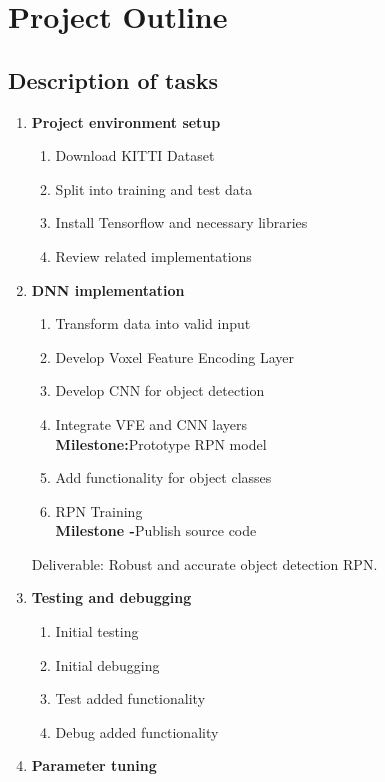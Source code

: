 \let\textcircled=\pgftextcircled
\chapter{Project Outline}
\label{chap:proj_outline}

\section{Description of tasks}

\begin{enumerate}
    \item \textbf{Project environment setup} 
    	\begin{enumerate}
    		\item Download KITTI Dataset
    		\item Split into training and test data
    		\item Install Tensorflow and necessary libraries 
    		\item Review related implementations
    	\end{enumerate}
    \item \textbf{DNN implementation}
   		\begin{enumerate}
   			\item Transform data into valid input
   			\item Develop Voxel Feature Encoding Layer
   			\item Develop CNN for object detection
   			\item Integrate VFE and CNN layers \\ 
   			\textbf{Milestone:}Prototype RPN model 
   			\item Add functionality for object classes 
   			\item RPN Training \\ 
   			\textbf{Milestone -}Publish source code 
   		\end{enumerate}
   	Deliverable: Robust and accurate object detection RPN.
    \item \textbf{Testing and debugging} 
    	\begin{enumerate}
    		\item Initial testing
    		\item Initial debugging
    		\item Test added functionality 
    		\item Debug added functionality 
    	\end{enumerate}
    \item \textbf{Parameter tuning} 

\end{enumerate}
